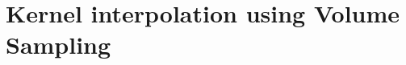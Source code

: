 \documentclass[twoside,11pt]{book}
\numberwithin{theorem}{chapter}
\numberwithin{definition}{chapter}
\numberwithin{proposition}{chapter}
\numberwithin{corollary}{chapter}
\numberwithin{example}{chapter}
\numberwithin{lemma}{chapter}
\numberwithin{assumption}{chapter}
\begin{document}



\clearpage

\chapter{Kernel interpolation using Volume Sampling}\label{chap:CVS}
\end{document}
